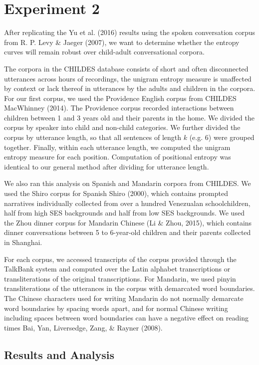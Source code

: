 \documentclass[10pt, letterpaper]{article}
\begin{document}
\section{Experiment 2}\label{experiment-2}

After replicating the Yu et al. (2016) results using the spoken
conversation corpus from R. P. Levy \& Jaeger (2007), we want to
determine whether the entropy curves will remain robust over child-adult
conversational corpora.

The corpora in the CHILDES database consists of short and often
disconnected utterances across hours of recordings, the unigram entropy
measure is unaffected by context or lack thereof in utterances by the
adults and children in the corpora. For our first corpus, we used the
Providence English corpus from CHILDES MacWhinney (2014). The Providence
corpus recorded interactions between children between 1 and 3 years old
and their parents in the home. We divided the corpus by speaker into
child and non-child categories. We further divided the corpus by
utterance length, so that all sentences of length \(k\) (e.g. \(6\))
were grouped together. Finally, within each utterance length, we
computed the unigram entropy measure for each position. Computation of
positional entropy was identical to our general method after dividing
for utterance length.

We also ran this analysis on Spanish and Mandarin corpora from CHILDES.
We used the Shiro corpus for Spanish Shiro (2000), which contains
prompted narratives individually collected from over a hundred
Venezualan schoolchildren, half from high SES backgrounds and half from
low SES backgrounds. We used the Zhou dinner corpus for Mandarin Chinese
(Li \& Zhou, 2015), which contains dinner conversations between 5 to
6-year-old children and their parents collected in Shanghai.

For each corpus, we accessed transcripts of the corpus provided through
the TalkBank system and computed over the Latin alphabet transcriptions
or transliterations of the original transcriptions. For Mandarin, we
used pinyin transliterations of the utterances in the corpus with
demarcated word boundaries. The Chinese characters used for writing
Mandarin do not normally demarcate word boundaries by spacing words
apart, and for normal Chinese writing including spaces between word
boundaries can have a negative effect on reading times Bai, Yan,
Liversedge, Zang, \& Rayner (2008).

\subsection{Results and Analysis}\label{results-and-analysis-1}
\end{document}
